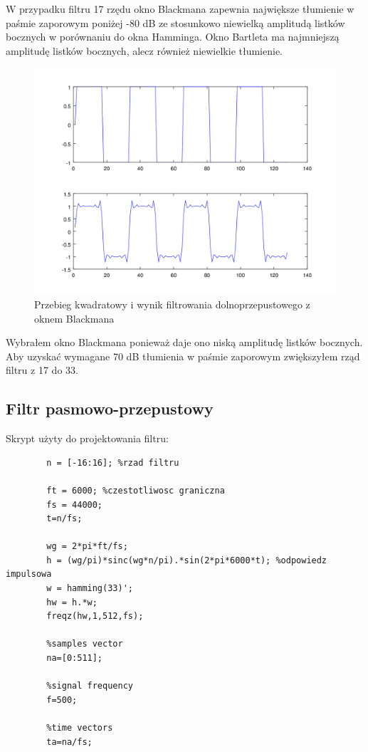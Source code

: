 \documentclass[12pt,titlepage]{report}
\begin{document}
W przypadku filtru 17 rzędu okno Blackmana zapewnia największe tłumienie w paśmie zaporowym poniżej -80 dB ze stosunkowo niewielką amplitudą listków bocznych w porównaniu do okna Hamminga. Okno Bartleta ma najmniejszą amplitudę listków bocznych, alecz również niewielkie tłumienie.
\newpage
\begin{figure}[!h]
	\centering
	\includegraphics[scale=0.7]{../cw31_output_kwadrat_Blackman_plot}
	\caption{Przebieg kwadratowy i wynik filtrowania dolnoprzepustowego z oknem Blackmana}
\end{figure}
Wybrałem okno Blackmana ponieważ daje ono niską amplitudę listków bocznych. Aby uzyskać wymagane 70 dB tłumienia w paśmie zaporowym zwiększyłem rząd filtru z 17 do 33.
\newpage

\subsection{Filtr pasmowo-przepustowy}
Skrypt użyty do projektowania filtru:
\begin{multicols}{3}
	{
		\tiny
		\begin{verbatim}
		n = [-16:16]; %rzad filtru
		
		ft = 6000; %czestotliwosc graniczna
		fs = 44000;
		t=n/fs;
		
		wg = 2*pi*ft/fs;
		h = (wg/pi)*sinc(wg*n/pi).*sin(2*pi*6000*t); %odpowiedz impulsowa
		w = hamming(33)';
		hw = h.*w;
		freqz(hw,1,512,fs);
		
		%samples vector
		na=[0:511];
		
		%signal frequency
		f=500;
		
		%time vectors
		ta=na/fs;
		\end{verbatim}
	}
\end{multicols}
\end{document}
